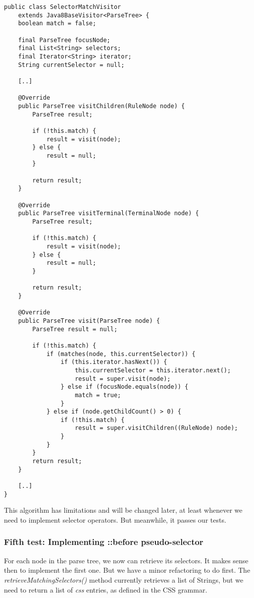\documentclass[11pt]{article}
\begin{document}
\begin{verbatim}
public class SelectorMatchVisitor
    extends Java8BaseVisitor<ParseTree> {
    boolean match = false;

    final ParseTree focusNode;
    final List<String> selectors;
    final Iterator<String> iterator;
    String currentSelector = null;

    [..]

    @Override
    public ParseTree visitChildren(RuleNode node) {
        ParseTree result;

        if (!this.match) {
            result = visit(node);
        } else {
            result = null;
        }

        return result;
    }

    @Override
    public ParseTree visitTerminal(TerminalNode node) {
        ParseTree result;

        if (!this.match) {
            result = visit(node);
        } else {
            result = null;
        }

        return result;
    }

    @Override
    public ParseTree visit(ParseTree node) {
        ParseTree result = null;

        if (!this.match) {
            if (matches(node, this.currentSelector)) {
                if (this.iterator.hasNext()) {
                    this.currentSelector = this.iterator.next();
                    result = super.visit(node);
                } else if (focusNode.equals(node)) {
                    match = true;
                }
            } else if (node.getChildCount() > 0) {
                if (!this.match) {
                    result = super.visitChildren((RuleNode) node);
                }
            }
        }
        return result;
    }

    [..]
}
\end{verbatim}

This algorithm has limitations and will be changed later, at least whenever we need to implement selector operators.
But meanwhile, it passes our tests.
\subsubsection{Fifth test: Implementing ::before pseudo-selector}
\label{sec-1-4-6}

For each node in the parse tree, we now can retrieve its selectors. It makes sense then to implement the first one.
But we have a minor refactoring to do first. The \emph{retrieveMatchingSelectors()} method currently retrieves a list of
Strings, but we need to return a list of \emph{css} entries, as defined in the CSS grammar.
\end{document}
